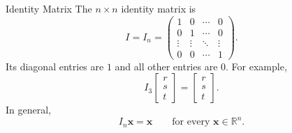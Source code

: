 \begin{frame}{Identity Matrix}
  The $n\times n$ identity matrix is
  \[
    I=I_n=
    \begin{pmatrix}
      1&0&\cdots&0\\
      0&1&\cdots&0\\
      \vdots&\vdots&\ddots&\vdots\\
      0&0&\cdots&1
    \end{pmatrix}.
  \]
  Its diagonal entries are $1$ and all other entries are $0$. For example,
  \[
    I_3\begin{bmatrix}r\\s\\t\end{bmatrix}
    =\begin{bmatrix}r\\s\\t\end{bmatrix}.
  \]
  In general,
  \[
    I_n\mathbf{x}=\mathbf{x}\qquad\text{for every }\mathbf{x}\in\mathbb{R}^n.
  \]
\end{frame}
